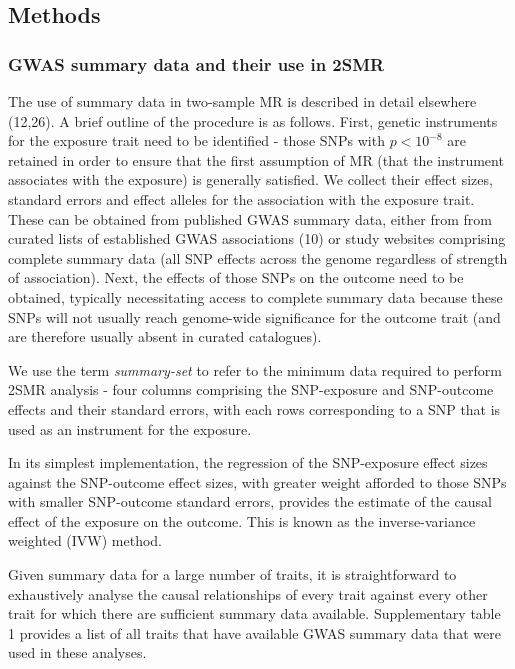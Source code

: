 \documentclass[]{article}
\begin{document}
\subsection{Methods}\label{methods}

\subsubsection{GWAS summary data and their use in
2SMR}\label{gwas-summary-data-and-their-use-in-2smr}

The use of summary data in two-sample MR is described in detail
elsewhere (12,26). A brief outline of the procedure is as follows.
First, genetic instruments for the exposure trait need to be identified
- those SNPs with \(p < 10^{-8}\) are retained in order to ensure that
the first assumption of MR (that the instrument associates with the
exposure) is generally satisfied. We collect their effect sizes,
standard errors and effect alleles for the association with the exposure
trait. These can be obtained from published GWAS summary data, either
from from curated lists of established GWAS associations (10) or study
websites comprising complete summary data (all SNP effects across the
genome regardless of strength of association). Next, the effects of
those SNPs on the outcome need to be obtained, typically necessitating
access to complete summary data because these SNPs will not usually
reach genome-wide significance for the outcome trait (and are therefore
usually absent in curated catalogues).

We use the term \emph{summary-set} to refer to the minimum data required
to perform 2SMR analysis - four columns comprising the SNP-exposure and
SNP-outcome effects and their standard errors, with each rows
corresponding to a SNP that is used as an instrument for the exposure.

In its simplest implementation, the regression of the SNP-exposure
effect sizes against the SNP-outcome effect sizes, with greater weight
afforded to those SNPs with smaller SNP-outcome standard errors,
provides the estimate of the causal effect of the exposure on the
outcome. This is known as the inverse-variance weighted (IVW) method.

Given summary data for a large number of traits, it is straightforward
to exhaustively analyse the causal relationships of every trait against
every other trait for which there are sufficient summary data available.
Supplementary table 1 provides a list of all traits that have available
GWAS summary data that were used in these analyses.
\end{document}

